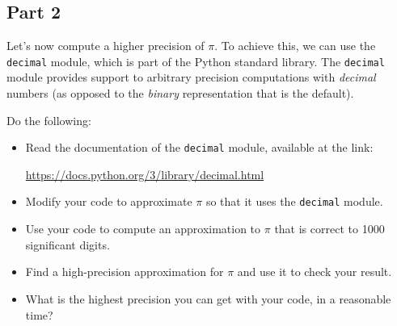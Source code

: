 \documentclass[12pt]{article}
\begin{document}
\subsection{Part 2} Let's now compute a higher precision of $\pi$. To achieve this, we can use the \texttt{decimal} module, which is part of the Python standard library. The \texttt{decimal} module provides support to arbitrary precision computations with \emph{decimal} numbers (as opposed to the \emph{binary} representation that is the default).

Do the following: 

\begin{itemize}
\item Read the documentation of the \texttt{decimal} module, available at the link:
\begin{center}
\url{https://docs.python.org/3/library/decimal.html}
\end{center}
\item Modify your code to approximate $\pi$ so that it uses the \texttt{decimal} module.
\item Use your code to compute an approximation to $\pi$ that is correct to 1000 significant digits.
\item Find a high-precision approximation for $\pi$ and use it to check your result.
\item What is the highest precision you can get with your code, in a reasonable time?
\end{itemize}
\end{document}
